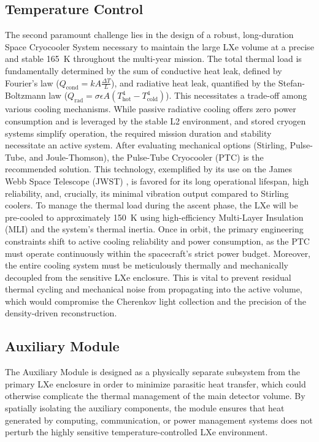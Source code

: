 \documentclass{aastex701}
\begin{document}
\subsection{Temperature Control}
The second paramount challenge lies in the design of a robust, long-duration Space Cryocooler System necessary to maintain the large LXe volume at a precise and stable \qty{165}{\kelvin} throughout the multi-year mission. The total thermal load is fundamentally determined by the sum of conductive heat leak, defined by Fourier's law ($Q_{\text{cond}} = kA\frac{\Delta T}{L}$), and radiative heat leak, quantified by the Stefan-Boltzmann law ($Q_{\text{rad}}=\sigma\epsilon A(T_{\text{hot}}^4-T_{\text{cold}}^4)$). This necessitates a trade-off among various cooling mechanisms. While passive radiative cooling offers zero power consumption and is leveraged by the stable L2 environment, and stored cryogen systems simplify operation, the required mission duration and stability necessitate an active system. After evaluating mechanical options (Stirling, Pulse-Tube, and Joule-Thomson), the Pulse-Tube Cryocooler (PTC) is the recommended solution. This technology, exemplified by its use on the James Webb Space Telescope (JWST) \cite{Gardner2023JWST}, is favored for its long operational lifespan, high reliability, and, crucially, its minimal vibration output compared to Stirling coolers. To manage the thermal load during the ascent phase, the LXe will be pre-cooled to approximately \qty{150}{\kelvin} using high-efficiency Multi-Layer Insulation (MLI) and the system's thermal inertia. Once in orbit, the primary engineering constraints shift to active cooling reliability and power consumption, as the PTC must operate continuously within the spacecraft's strict power budget. Moreover, the entire cooling system must be meticulously thermally and mechanically decoupled from the sensitive LXe enclosure. This is vital to prevent residual thermal cycling and mechanical noise from propagating into the active volume, which would compromise the Cherenkov light collection and the precision of the density-driven reconstruction.

\subsection{Auxiliary Module}

The Auxiliary Module is designed as a physically separate subsystem from the primary LXe enclosure in order to minimize parasitic heat transfer, which could otherwise complicate the thermal management of the main detector volume. By spatially isolating the auxiliary components, the module ensures that heat generated by computing, communication, or power management systems does not perturb the highly sensitive temperature-controlled LXe environment. 
\end{document}
